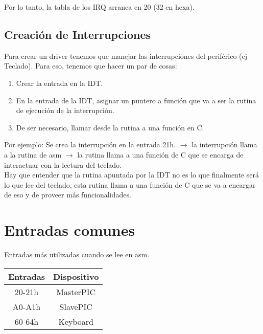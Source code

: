 \documentclass[]{article}
\begin{document}
Por lo tanto, la tabla de los IRQ arranca en 20 (32 en hexa).

\subsection*{Creaci\'on de Interrupciones}
Para crear un driver tenemos que manejar las interrupciones del perif\'erico (ej Teclado).
Para eso, tenemos que hacer un par de cosas:

\begin{center}
	\begin{enumerate}
		\item Crear la entrada en la IDT.
		\item En la entrada de la IDT, asignar un puntero a funci\'on que va a ser la rutina
		de ejecuci\'on de la interrupci\'on.
		\item De ser necesario, llamar desde la rutina a una funci\'on en C.
	\end{enumerate}
\end{center}

Por ejemplo: Se crea la interrupci\'on en la entrada 21h. $\longrightarrow$ la interrupci\'on llama a la rutina de asm $\longrightarrow$ la rutina llama a una funci\'on de C que se encarga de interactuar con la lectura del teclado.\\

Hay que entender que la rutina apuntada por la IDT no es lo que finalmente ser\'a lo que lee del teclado, esta rutina llama a una funci\'on de C que se va a encargar de eso y de proveer m\'as funcionalidades.

\section*{Entradas comunes}
Entradas m\'as utilizadas cuando se lee en asm.
\begin{center}
	\begin{tabular}{ |c|c| }
		\hline
		Entradas & Dispositivo\\
		\hline	
		20-21h & MasterPIC\\
		A0-A1h & SlavePIC\\
		60-64h & Keyboard\\
		\hline
	\end{tabular}
\end{center}

	
\end{document}

